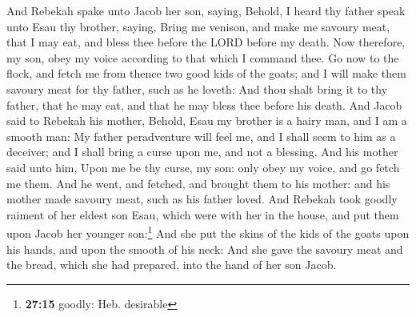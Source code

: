  And Rebekah spake unto Jacob her son, saying, Behold, I
heard thy father speak unto Esau thy brother, saying, 
Bring me venison, and make me savoury meat, that I may eat, and bless
thee before the LORD before my death.  Now therefore, my
son, obey my voice according to that which I command thee.
 Go now to the flock, and fetch me from thence two good
kids of the goats; and I will make them savoury meat for thy father,
such as he loveth:  And thou shalt bring it to thy
father, that he may eat, and that he may bless thee before his death.
 And Jacob said to Rebekah his mother, Behold, Esau my
brother is a hairy man, and I am a smooth man:  My father
peradventure will feel me, and I shall seem to him as a deceiver; and I
shall bring a curse upon me, and not a blessing.  And his
mother said unto him, Upon me be thy curse, my son: only obey my voice,
and go fetch me them.  And he went, and fetched, and
brought them to his mother: and his mother made savoury meat, such as
his father loved.  And Rebekah took goodly raiment of her
eldest son Esau, which were with her in the house, and put them upon
Jacob her younger son:\footnote{\textbf{27:15} goodly: Heb. desirable}
 And she put the skins of the kids of the goats upon his
hands, and upon the smooth of his neck:  And she gave the
savoury meat and the bread, which she had prepared, into the hand of her
son Jacob.

